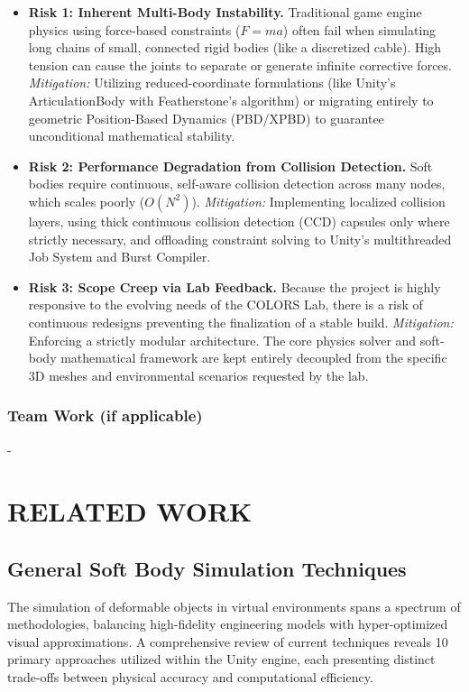 \documentclass[a4paper,12pt]{report}
\begin{document}
\begin{itemize}
    \item \textbf{Risk 1: Inherent Multi-Body Instability.} Traditional game engine physics using force-based constraints ($F=ma$) often fail when simulating long chains of small, connected rigid bodies (like a discretized cable). High tension can cause the joints to separate or generate infinite corrective forces. \textit{Mitigation:} Utilizing reduced-coordinate formulations (like Unity's ArticulationBody with Featherstone's algorithm) or migrating entirely to geometric Position-Based Dynamics (PBD/XPBD) to guarantee unconditional mathematical stability.
    \item \textbf{Risk 2: Performance Degradation from Collision Detection.} Soft bodies require continuous, self-aware collision detection across many nodes, which scales poorly ($O(N^2)$). \textit{Mitigation:} Implementing localized collision layers, using thick continuous collision detection (CCD) capsules only where strictly necessary, and offloading constraint solving to Unity's multithreaded Job System and Burst Compiler.
    \item \textbf{Risk 3: Scope Creep via Lab Feedback.} Because the project is highly responsive to the evolving needs of the COLORS Lab, there is a risk of continuous redesigns preventing the finalization of a stable build. \textit{Mitigation:} Enforcing a strictly modular architecture. The core physics solver and soft-body mathematical framework are kept entirely decoupled from the specific 3D meshes and environmental scenarios requested by the lab.
\end{itemize}

\subsection{Team Work (if applicable)}
-
\chapter{RELATED WORK}

\section{General Soft Body Simulation Techniques}
The simulation of deformable objects in virtual environments spans a spectrum of methodologies, balancing high-fidelity engineering models with hyper-optimized visual approximations. A comprehensive review of current techniques reveals 10 primary approaches utilized within the Unity engine, each presenting distinct trade-offs between physical accuracy and computational efficiency. 
\end{document}
